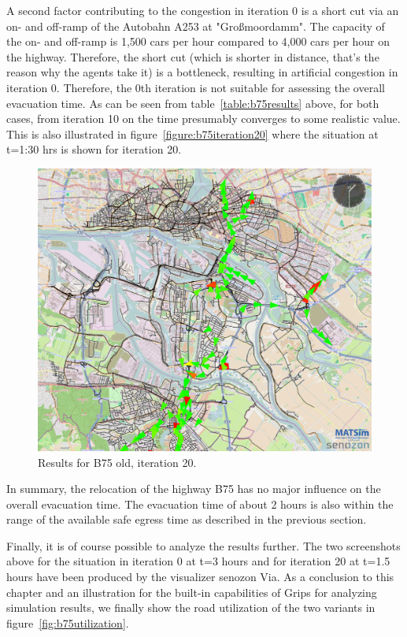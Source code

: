 A second factor contributing to the congestion in iteration 0 is a short cut via an on- and off-ramp of the Autobahn A253 at "Gro{\ss}moordamm". The capacity of the on- and off-ramp is 1,500 cars per hour compared to 4,000 cars per hour on the highway. Therefore, the short cut (which is shorter in distance, that's the reason why the agents take it) is a bottleneck, resulting in artificial congestion in iteration 0.
Therefore, the 0th iteration is not suitable for assessing the overall evacuation time. As can be seen from table~\ref{table:b75results} above, for both cases, from iteration 10 on the time presumably converges to some realistic value. This is also illustrated in figure~\ref{figure:b75iteration20} where the situation at t=1:30 hrs is shown for iteration 20.

\begin{figure}
\centering
\includegraphics[width=0.7\linewidth]{extending/figures/Evacuation/B75iteration20}
\caption{Results for B75 old, iteration 20.}
\label{fig:B75iteration20}
\end{figure}


In summary, the relocation of the highway B75 has no major influence on the overall evacuation time. The evacuation time of about 2 hours is also within the range of the available safe egress time as described in the previous section. 

Finally, it is of course possible to analyze the results further. The two screenshots above for the situation in iteration 0 at t=3 hours and for iteration 20 at t=1.5 hours have been produced by the visualizer senozon Via.
As a conclusion to this chapter and an illustration for the built-in capabilities of Grips for analyzing simulation results, we finally show the road utilization of the two variants in figure~\ref{fig:b75utilization}.

